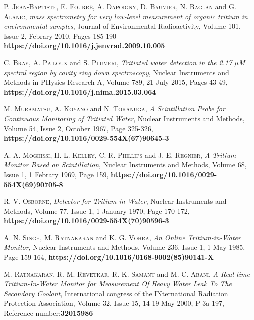 \begin{thebibliography}{100}
 \textsc{P. Jean-Baptiste}, \textsc{E. Fourré}, \textsc{A. Dapoigny}, \textsc{D. Baumier}, \textsc{N. Baglan} and \textsc{G. Alanic},
\textit{ mass spectrometry for very low-level measurement of organic tritium in environmental samples}, Journal of Environmental Radioactivity, Volume 101, Issue 2, Febrary 2010, Pages 185-190 \textbf{https://doi.org/10.1016/j.jenvrad.2009.10.005} 

 \textsc{C. Bray}, \textsc{A. Pailoux} and \textsc{S. Plumeri},
\textit{Tritiated water detection in the 2.17 $\mu$M spectral region by cavity ring down spectroscopy},  Nuclear Instruments and Methods in PHysics Research A, Volume 789, 21 July 2015, Pages 43-49, \textbf{https://doi.org/10.1016/j.nima.2015.03.064} 

 \textsc{M. Muramatsu}, \textsc{A. Koyano} and \textsc{N. Tokanuga},
\textit{A Scintillation Probe for Continuous Monitoring of Tritiated Water}, Nuclear Instruments and Methods, Volume 54, Issue 2, October 1967, Page 325-326, \textbf{https://doi.org/10.1016/0029-554X(67)90645-3}

 \textsc{A. A. Moghissi}, \textsc{H. L. Kelley}, \textsc{C. R. Phillips} and \textsc{J. E. Regnier},
\textit{A Tritium Monitor Based on Scintillation}, Nuclear Instruments and Methods, Volume 68, Issue 1, 1 Febrary 1969, Page 159, \textbf{https://doi.org/10.1016/0029-554X(69)90705-8}

 \textsc{R. V. Osborne},
\textit{Detector for Tritium in Water}, Nuclear Instruments and Methods, Volume 77, Issue 1, 1 January 1970, Page 170-172, \textbf{https://doi.org/10.1016/0029-554X(70)90596-3}

 \textsc{A. N. Singh}, \textsc{M. Ratnakaran} and \textsc{K. G. Vohra},
\textit{An Online Tritium-in-Water Monitor}, Nuclear Instruments and Methods, Volume 236, Issue 1, 1 May 1985, Page 159-164, \textbf{https://doi.org/10.1016/0168-9002(85)90141-X}

 \textsc{M. Ratnakaran}, \textsc{R. M. Revetkar}, \textsc{R. K. Samant} and \textsc{M. C. Abani},
\textit{A Real-time Tritium-In-Water Monitor for Measurement Of Heavy Water Leak To The Secondary Coolant}, International congress of the INternational Radiation Protection Association, Volume 32, Issue 15, 14-19 May 2000, P-3a-197, Reference number:\textbf{32015986}


\end{thebibliography}
